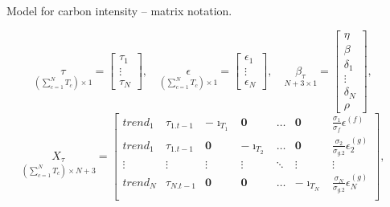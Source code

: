 \documentclass[notes,blackandwhite,mathsans,usenames,dvipsnames]{beamer}
\begin{document}
\begin{frame}{Model for carbon intensity -- matrix notation.}

\small
$$
\underset{(\sum_{c=1}^{N}T_c)\times1}{\tau}=\begin{bmatrix}\tau_{1}\\\vdots\\\tau_{N}\end{bmatrix}, \quad 
\underset{(\sum_{c=1}^{N}T_c)\times1}{\epsilon}=\begin{bmatrix}\epsilon_{1}\\\vdots\\\epsilon_{N}\end{bmatrix}, \quad 
\underset{N+3\times1}{\beta_\tau}=\begin{bmatrix}  \eta\\ \beta \\ \delta_1\\ \vdots\\ \delta_N\\ \rho\end{bmatrix}, \quad 
$$
$$
\underset{(\sum_{c=1}^{N}T_c)\times N+3}{X_\tau}=\begin{bmatrix}
trend_{1}&\tau_{1.t-1}&-\imath_{T_1}&\mathbf{0}&\dots&\mathbf{0}& \frac{\sigma_1}{\sigma_{f}}\epsilon^{(f)}\\
trend_{1}&\tau_{1.t-1}&\mathbf{0}&-\imath_{T_2}&\dots&\mathbf{0}& \frac{\sigma_2}{\sigma_{g.2}}\epsilon^{(g)}_2\\
\vdots&\vdots&\vdots&\vdots&\ddots&\vdots&\vdots\\ 
trend_{N}&\tau_{N.t-1}&\mathbf{0}&\mathbf{0}&\dots&-\imath_{T_N}& \frac{\sigma_N}{\sigma_{g.2}}\epsilon^{(g)}_N\\
\end{bmatrix}, \quad 
$$
\end{frame}
\end{document}
